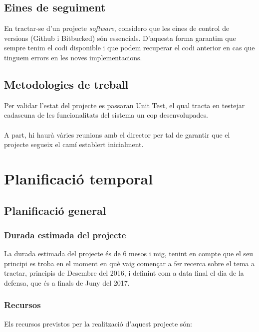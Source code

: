 \documentclass[11pt,catalan,listoffigures,listoftables]{tfgetsinf}
\begin{document}
\subsection{Eines de seguiment} 

En tractar-se d’un projecte \textit{software}, considero que les eines de control de versions (Github i Bitbucked) són essencials. D’aquesta forma garantim que sempre tenim el codi disponible i que podem recuperar el codi anterior en cas que tinguem errors en les noves implementacions.


\subsection{Metodologies de treball} 

Per validar l’estat del projecte es passaran Unit Test, el qual tracta en testejar cadascuna de les funcionalitats del sistema un cop desenvolupades.\\ \\
A part, hi haurà vàries reunions amb el director per tal de garantir que el projecte segueix el camí establert inicialment.

\section{Planificació temporal}

\subsection{Planificació general}

\subsubsection{Durada estimada del projecte}

La durada estimada del projecte és de 6 mesos i mig, tenint en compte que el seu principi es troba en el moment en què vaig començar a fer recerca sobre el tema a tractar, principis de Desembre del 2016, i definint com a data final el dia de la defensa, que és a finals de Juny del 2017.

\subsubsection{Recursos}

Els recursos previstos per la realització d’aquest projecte són:
\end{document}
